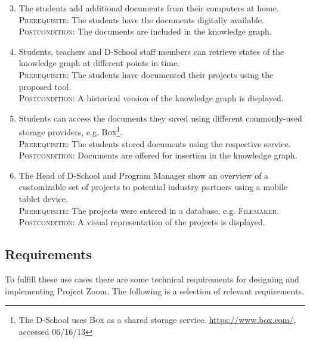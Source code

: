 \begin{enumerate}
\setcounter{enumi}{2}

\item The students add additional documents from their computers at home.\\
\textsc{Prerequisite}: The students have the documents digitally available.\\
\textsc{Postcondition}: The documents are included in the knowledge graph. \label{uc:fromhome}

\item Students, teachers and D-School staff members can retrieve states of the knowledge graph at different points in time.\\
\textsc{Prerequisite}: The students have documented their projects using the proposed tool.\\
\textsc{Postcondition}: A historical version of the knowledge graph is displayed.  \label{uc:versions}

\item Students can access the documents they saved using different commonly-used storage providers, e.g. \textsc{Box}\footnote{The D-School uses \textsc{Box} as a shared storage service. \url{https://www.box.com/}, accessed 06/16/13}.\\
\textsc{Prerequisite}: The students stored documents using the respective service.\\
\textsc{Postcondition}: Documents are offered for insertion in the knowledge graph.  \label{uc:storageproviders}

\item The Head of D-School and Program Manager show an overview of a customizable set of projects to potential industry partners using a mobile tablet device.\\
\textsc{Prerequisite}: The projects were entered in a database, e.g. \textsc{Filemaker}.\\
\textsc{Postcondition}: A visual representation of the projects is displayed. \label{uc:multiplatform}
\end{enumerate}

\subsection{Requirements}

To fulfill these use cases there are some technical requirements for designing and implementing Project Zoom. The following is a selection of relevant requirements.

